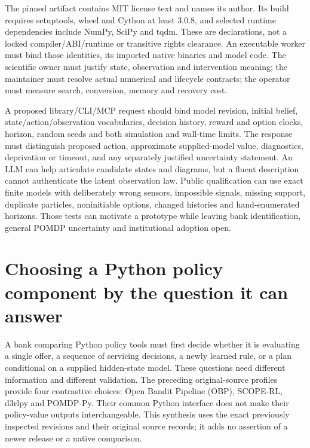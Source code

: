 The pinned artifact contains MIT license text and names its author. Its build
requires setuptools, wheel and Cython at least 3.0.8, and selected runtime
dependencies include NumPy, SciPy and tqdm. These are declarations, not a
locked compiler/ABI/runtime or transitive rights clearance. An executable worker
must bind those identities, its imported native binaries and model code. The
scientific owner must justify state, observation and intervention meaning; the
maintainer must resolve actual numerical and lifecycle contracts; the operator
must measure search, conversion, memory and recovery cost.
\citep{exec23_pomdppy_sources}

A proposed library/CLI/MCP request should bind model revision, initial belief,
state/action/observation vocabularies, decision history, reward and option clocks,
horizon, random seeds and both simulation and wall-time limits. The response
must distinguish proposed action, approximate supplied-model value, diagnostics,
deprivation or timeout, and any separately justified uncertainty statement.
An LLM can help articulate candidate states and diagrams, but a fluent
description cannot authenticate the latent observation law. Public qualification
can use exact finite models with deliberately wrong sensors, impossible signals,
missing support, duplicate particles, noninitiable options, changed histories
and hand-enumerated horizons. Those tests can motivate a prototype while leaving
bank identification, general POMDP uncertainty and institutional adoption open.


\section{Choosing a Python policy component by the question it can answer}
\label{sec:exec24-policies-python}

A bank comparing Python policy tools must first decide whether it is evaluating
a single offer, a sequence of servicing decisions, a newly learned rule, or a
plan conditional on a supplied hidden-state model. These questions need different
information and different validation. The preceding original-source profiles
provide four contrastive choices: Open Bandit Pipeline (OBP), SCOPE-RL, d3rlpy
and POMDP-Py. Their common Python interface does not make their policy-value
outputs interchangeable. This synthesis uses the exact previously inspected
revisions and their original source records; it adds no assertion of a newer
release or a native comparison.~\citep{exec23_obp_sources,exec23_scope_rl_sources,
exec15_d3rlpy_package,exec23_pomdppy_sources}

